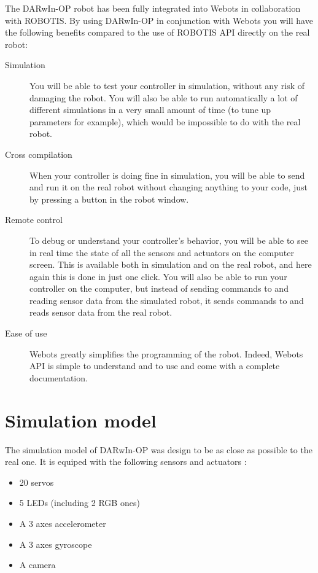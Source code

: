 \documentclass[a4paper, 12pt]{article}  		%
\begin{document}
The DARwIn-OP robot has been fully integrated into Webots in collaboration with ROBOTIS. By using DARwIn-OP in conjunction with Webots you will have the following benefits compared to the use of ROBOTIS API directly on the real robot:
\begin{description}
\item[Simulation ] You will be able to test your controller in simulation, without any risk of damaging the robot. You will also be able to run automatically a lot of different simulations in a very small amount of time (to tune up parameters for example), which would be impossible to do with the real robot.
\item[Cross compilation ] When your controller is doing fine in simulation, you will be able to send and run it on the real robot without changing anything to your code, just by pressing a button in the robot window.
\item[Remote control ] To debug or understand your controller's behavior, you will be able to see in real time the state of all the sensors and actuators on the computer screen. This is available both in simulation and on the real robot, and here again this is done in just one click. You will also be able to run your controller on the computer, but instead of sending commands to and reading sensor data from the simulated robot, it sends commands to and reads sensor data from the real robot.
\item[Ease of use ] Webots greatly simplifies the programming of the robot. Indeed, Webots API is simple to understand and to use and come with a complete documentation.
\end{description}


\newpage
\section{Simulation model}

The simulation model of DARwIn-OP was design to be as close as possible to the real one. It is equiped with the following sensors and actuators :
\begin{itemize}
\item 20 servos
\item 5 LEDs (including 2 RGB ones)
\item A 3 axes accelerometer
\item A 3 axes gyroscope
\item A camera
\end{itemize}
\end{document}
